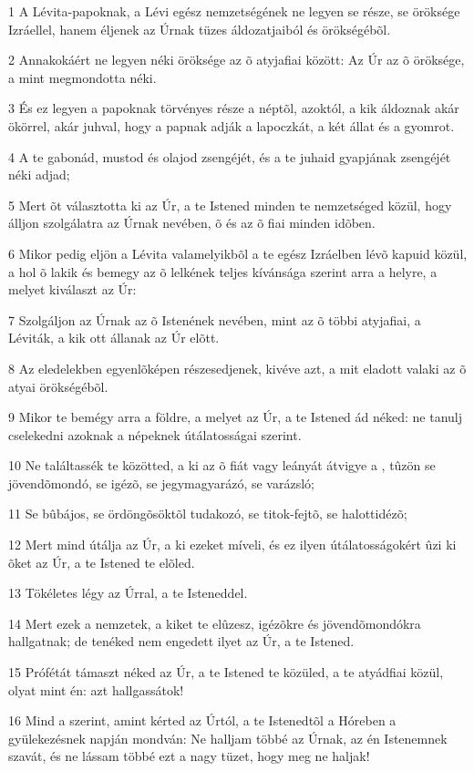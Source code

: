 \par 1 A Lévita-papoknak, a Lévi egész nemzetségének ne legyen se része, se öröksége Izráellel, hanem éljenek az Úrnak tüzes áldozatjaiból és örökségébõl.
\par 2 Annakokáért ne legyen néki öröksége az õ atyjafiai között: Az Úr az õ öröksége, a mint megmondotta néki.
\par 3 És ez legyen a papoknak törvényes része a néptõl, azoktól, a kik áldoznak akár ökörrel, akár juhval, hogy a papnak adják a lapoczkát, a két állat és a gyomrot.
\par 4 A te gabonád, mustod és olajod zsengéjét, és a te juhaid gyapjának zsengéjét néki adjad;
\par 5 Mert õt választotta ki az Úr, a te Istened minden te nemzetséged közül, hogy álljon szolgálatra az Úrnak nevében, õ és az õ fiai minden idõben.
\par 6 Mikor pedig eljön a Lévita valamelyikbõl a te egész Izráelben lévõ kapuid közül, a hol õ lakik és bemegy az õ lelkének teljes kívánsága szerint arra a helyre, a melyet kiválaszt az Úr:
\par 7 Szolgáljon az Úrnak az õ Istenének nevében, mint az õ többi atyjafiai, a Léviták, a kik ott állanak az Úr elõtt.
\par 8 Az eledelekben egyenlõképen részesedjenek, kivéve azt, a mit eladott valaki az õ atyai örökségébõl.
\par 9 Mikor te bemégy arra a földre, a melyet az Úr, a te Istened ád néked: ne tanulj cselekedni azoknak a népeknek útálatosságai szerint.
\par 10 Ne találtassék te közötted, a ki az õ fiát vagy leányát átvigye a , tûzön se  jövendõmondó, se igézõ, se jegymagyarázó, se varázsló;
\par 11 Se bûbájos, se ördöngõsöktõl tudakozó, se titok-fejtõ, se halottidézõ;
\par 12 Mert mind útálja az Úr, a ki ezeket míveli, és ez ilyen útálatosságokért ûzi ki õket az Úr, a te Istened te elõled.
\par 13 Tökéletes légy az Úrral, a te Isteneddel.
\par 14 Mert ezek a nemzetek, a kiket te elûzesz, igézõkre és jövendõmondókra hallgatnak; de tenéked nem engedett ilyet az Úr, a te Istened.
\par 15 Prófétát támaszt néked az Úr, a te Istened te közüled, a te atyádfiai közül, olyat mint én: azt hallgassátok!
\par 16 Mind a szerint, amint kérted az Úrtól, a te Istenedtõl a Hóreben a gyülekezésnek napján mondván: Ne halljam többé az Úrnak, az én Istenemnek szavát, és ne lássam többé ezt a nagy tüzet, hogy meg ne haljak!

